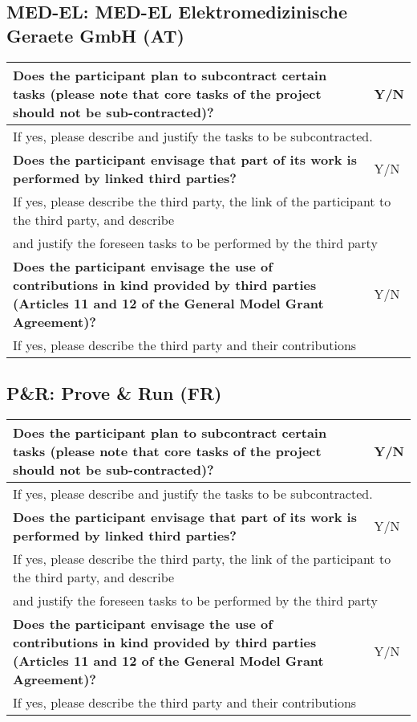 \subsection{MED-EL: MED-EL Elektromedizinische Geraete GmbH (AT)}

\begin{longtable}{|p{}|p{}|}
\hline
{\bf Does the participant plan to subcontract certain tasks (please
  note that core tasks of the project should not be sub-contracted)?}
&
Y/N
\\
\hline
\multicolumn{2}{|l|}{
If yes, please describe and justify the tasks to be subcontracted.}
\\
\hline
{\bf Does the participant envisage that  part of its work is performed
  by linked third parties?}
&
Y/N
\\
\hline
\multicolumn{2}{|l|}{If yes, please describe the third party, the link of the
  participant to the third party, and describe}\\
\multicolumn{2}{|l|}{and justify the foreseen
tasks to be performed by the third party}
\\
\hline
{\bf Does the participant envisage the use of contributions in kind
provided by third parties (Articles 11 and 12 of the General Model
Grant Agreement)?}
&
Y/N
\\
\hline
\multicolumn{2}{|l|}{If yes, please describe the third party and their contributions}
\\
\hline
\end{longtable}


\subsection{P\&R: Prove \& Run (FR)}

\begin{longtable}{|p{}|p{}|}
\hline
{\bf Does the participant plan to subcontract certain tasks (please
  note that core tasks of the project should not be sub-contracted)?}
&
Y/N
\\
\hline
\multicolumn{2}{|l|}{
If yes, please describe and justify the tasks to be subcontracted.}
\\
\hline
{\bf Does the participant envisage that  part of its work is performed
  by linked third parties?}
&
Y/N
\\
\hline
\multicolumn{2}{|l|}{If yes, please describe the third party, the link of the
  participant to the third party, and describe}\\
\multicolumn{2}{|l|}{and justify the foreseen
tasks to be performed by the third party}
\\
\hline
{\bf Does the participant envisage the use of contributions in kind
provided by third parties (Articles 11 and 12 of the General Model
Grant Agreement)?}
&
Y/N
\\
\hline
\multicolumn{2}{|l|}{If yes, please describe the third party and their contributions}
\\
\hline
\end{longtable}


